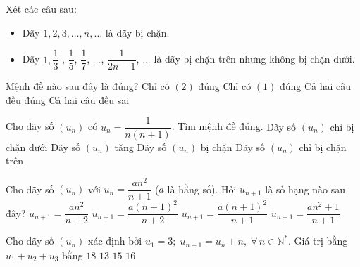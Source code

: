 \begin{ex}%
	Xét các câu sau:
	\begin{itemize}
		\item[(1)] Dãy $1,2,3,\ldots,n,\ldots$ là dãy bị chặn.
		\item[(2)] Dãy $1,\dfrac{1}{3}$ , $\dfrac{1}{5}$, $\dfrac{1}{7}$, $\ldots$, $\dfrac{1}{2n-1}$, $\ldots$ là dãy bị chặn trên nhưng không bị chặn dưới.
	\end{itemize}
	Mệnh đề nào sau đây là đúng?
	\choice
	{Chỉ có $(2)$ đúng}
	{Chỉ có $(1)$ đúng}
	{Cả hai câu đều đúng}
	{\True Cả hai câu đều sai}
\end{ex}

\begin{ex}%
	Cho dãy số $\left(u_{n} \right)$ có $u_{n} =\dfrac{1}{n\left(n+1\right)}$. Tìm mệnh đề đúng.
	\choice
	{Dãy số $\left(u_{n} \right)$ chỉ bị chặn dưới}
	{Dãy số $\left(u_{n} \right)$ tăng}
	{\True Dãy số $\left(u_{n} \right)$ bị chặn}
	{Dãy số $\left(u_{n} \right)$ chỉ bị chặn trên}
\end{ex}

\begin{ex}%
	Cho dãy số $\left(u_{n} \right)$ với $u_{n} =\dfrac{an^{2} }{n+1} $  ($a$ là hằng số). Hỏi $u_{n+1}$ là số hạng nào sau đây?
	\choice
	{$u_{n+1} =\dfrac{an^{2} }{n+2} $}
	{\True $u_{n+1} =\dfrac{a\left(n+1\right)^{2} }{n+2} $}
	{$u_{n+1} =\dfrac{a\left(n+1\right)^{2} }{n+1} $}
	{$u_{n+1} =\dfrac{an^{2} +1}{n+1} $}
\end{ex}

\begin{ex}%
	Cho dãy số $\left(u_{n} \right)$ xác định bởi $u_{1} =3;\; u_{n+1} =u_{n} +n,\; \forall \, n\in \mathbb{N}^{*} $. Giá trị bằng $u_{1} +u_{2} +u_{3}$ bằng
	\choice
	{$18$}
	{\True $13$}
	{$15$}
	{$16$}
\end{ex}

